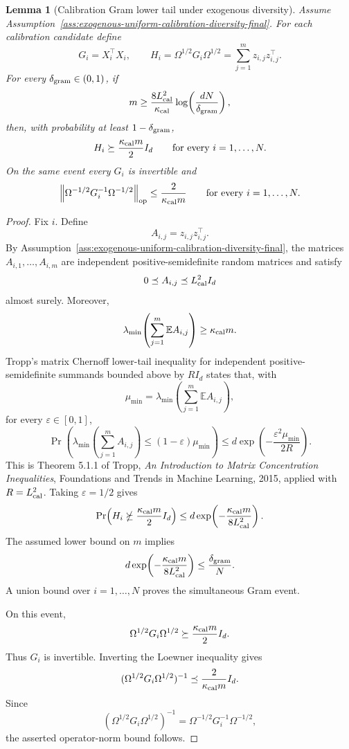 \documentclass{article} %
\newtheorem{lemma}[theorem]{Lemma}
\begin{document}
\begin{lemma}[Calibration Gram lower tail under exogenous diversity]
\label{lem:calibration-gram-lower-tail-final}
Assume Assumption~\ref{ass:exogenous-uniform-calibration-diversity-final}.  For
each calibration candidate define
\[
G_i=X_i^\top X_i,
\qquad
H_i=\Omega^{1/2}G_i\Omega^{1/2}
=
\sum_{j=1}^m z_{i,j}z_{i,j}^{\top}.
\]
For every \(\delta_{\rm gram}\in(0,1)\), if
\[
m
\ge
\frac{8L_{\rm cal}^2}{\kappa_{\rm cal}}
\log\!\left(\frac{dN}{\delta_{\rm gram}}\right),
\]
then, with probability at least \(1-\delta_{\rm gram}\),
\[
H_i\succeq \frac{\kappa_{\rm cal}m}{2}I_d
\qquad
\text{for every }i=1,\ldots,N.
\]
On the same event every \(G_i\) is invertible and
\[
\left\|\Omega^{-1/2}G_i^{-1}\Omega^{-1/2}\right\|_{\mathrm{op}}
\le
\frac{2}{\kappa_{\rm cal}m}
\qquad
\text{for every }i=1,\ldots,N.
\]
\end{lemma}

\begin{proof}
Fix \(i\).  Define
\[
A_{i,j}=z_{i,j}z_{i,j}^{\top}.
\]
By Assumption~\ref{ass:exogenous-uniform-calibration-diversity-final}, the
matrices \(A_{i,1},\ldots,A_{i,m}\) are independent positive-semidefinite random
matrices and satisfy
\[
0\preceq A_{i,j}\preceq L_{\rm cal}^2 I_d
\]
almost surely.  Moreover,
\[
\lambda_{\min}\!\left(\sum_{j=1}^m\mathbb{E}A_{i,j}\right)
\ge
\kappa_{\rm cal}m.
\]
Tropp's matrix Chernoff lower-tail inequality for independent
positive-semidefinite summands bounded above by \(R I_d\) states that, with
\[
\mu_{\min}
=
\lambda_{\min}\!\left(\sum_{j=1}^m\mathbb{E}A_{i,j}\right),
\]
for every \(\varepsilon\in[0,1]\),
\[
\Pr\!\left(
\lambda_{\min}\!\left(\sum_{j=1}^m A_{i,j}\right)
\le
(1-\varepsilon)\mu_{\min}
\right)
\le
d\exp\!\left(-\frac{\varepsilon^2\mu_{\min}}{2R}\right).
\]
This is Theorem 5.1.1 of Tropp, \emph{An Introduction to Matrix Concentration
Inequalities}, Foundations and Trends in Machine Learning, 2015, applied with
\(R=L_{\rm cal}^2\).  Taking \(\varepsilon=1/2\) gives
\[
\Pr\!\left(
H_i\nsucceq \frac{\kappa_{\rm cal}m}{2}I_d
\right)
\le
d\exp\!\left(-\frac{\kappa_{\rm cal}m}{8L_{\rm cal}^2}\right).
\]
The assumed lower bound on \(m\) implies
\[
d\exp\!\left(-\frac{\kappa_{\rm cal}m}{8L_{\rm cal}^2}\right)
\le
\frac{\delta_{\rm gram}}{N}.
\]
A union bound over \(i=1,\ldots,N\) proves the simultaneous Gram event.

On this event,
\[
\Omega^{1/2}G_i\Omega^{1/2}\succeq \frac{\kappa_{\rm cal}m}{2}I_d.
\]
Thus \(G_i\) is invertible.  Inverting the Loewner inequality gives
\[
(\Omega^{1/2}G_i\Omega^{1/2})^{-1}
\preceq
\frac{2}{\kappa_{\rm cal}m}I_d.
\]
Since
\[
(\Omega^{1/2}G_i\Omega^{1/2})^{-1}
=
\Omega^{-1/2}G_i^{-1}\Omega^{-1/2},
\]
the asserted operator-norm bound follows.
\end{proof}
\end{document}
